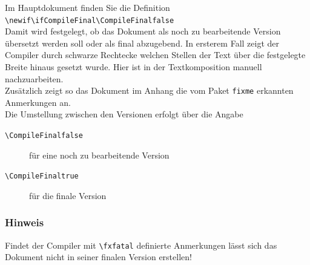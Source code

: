 \renewcommand*{\authorOfNextLines}{Helmut Quinz}
Im Hauptdokument finden Sie die Definition\\
\verb|\newif\ifCompileFinal\CompileFinalfalse|\\
Damit wird festgelegt, ob das Dokument als noch zu bearbeitende Version übersetzt werden soll oder als final abzugebend.
In ersterem Fall zeigt der Compiler durch schwarze Rechtecke welchen Stellen der Text über die festgelegte Breite hinaus gesetzt wurde.
Hier ist in der Textkomposition manuell nachzuarbeiten.\\
Zusätzlich zeigt so das Dokument im Anhang die vom Paket \texttt{fixme} erkannten Anmerkungen an.\\

Die Umstellung zwischen den Versionen erfolgt über die Angabe 
\begin{description}
	\item[\texttt{\textbackslash CompileFinalfalse}] für eine noch zu bearbeitende Version \bzw
	\item[\texttt{\textbackslash CompileFinaltrue}] für die finale Version 
\end{description}
\subsubsection{Hinweis}
Findet der Compiler mit \verb|\fxfatal| definierte Anmerkungen lässt sich das Dokument nicht in seiner finalen Version erstellen!
